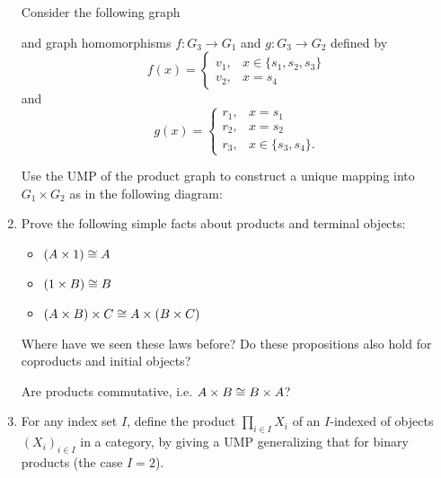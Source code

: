 \documentclass{scrartcl}
\begin{document}
\begin{enumerate}
  Consider the following graph
  \begin{center}
  \end{center}
  and graph homomorphisms $f: G_3 \rightarrow G_1$ and $g: G_3 \rightarrow G_2$ defined by
  \[
    f(x) =
    \begin{cases}
      v_1, & x \in \{ s_1, s_2, s_3 \} \\
      v_2, & x = s_4
    \end{cases}
  \]
  and
  \[
    g(x) =
    \begin{cases}
      r_1, & x = s_1 \\
      r_2, & x = s_2 \\
      r_3, & x \in \{ s_3, s_4 \}.
    \end{cases}
  \]

  Use the UMP of the product graph to construct a unique mapping into $G_1 \times G_2$ as in the following diagram:
  \begin{center}
  \end{center}

\item
  Prove the following simple facts about products and terminal objects:
  \begin{itemize}
  \item $(A \times 1) \cong A$
  \item $(1 \times B) \cong B$
  \item $(A \times B) \times C \cong A \times (B \times C)$
  \end{itemize}
  Where have we seen these laws before?
  Do these propositions also hold for coproducts and initial objects?

  Are products commutative, i.e. $A \times B \cong B \times A$?

\item
  For any index set $I$, define the product $\prod_{i \in I} X_i$ of an $I$-indexed of objects $(X_i)_{i \in I}$ in a category, by giving a UMP generalizing that for binary products (the case $I = 2$).


\end{enumerate}
\end{document}
